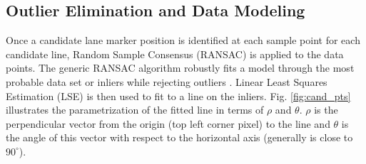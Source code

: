 \documentclass{article}
\begin{document}
\subsection{Outlier Elimination and Data Modeling}
Once a candidate lane marker position is identified at each sample point for each candidate line, Random Sample Consensus (RANSAC) is applied to the data points. The generic RANSAC algorithm robustly fits a model through the most probable data set or inliers while rejecting outliers \cite{hartley_multiple_2004,fischler_random_1981}. Linear Least Squares Estimation (LSE) is then used to fit to a line on the inliers. Fig. \ref{fig:cand_pts} illustrates the parametrization of the fitted line in terms of $\rho$ and $\theta$. $\rho$ is the perpendicular vector from the origin (top left corner pixel) to the line and $\theta$ is the angle of this vector with respect to the horizontal axis (generally is close to $90^\circ$).
\end{document}
